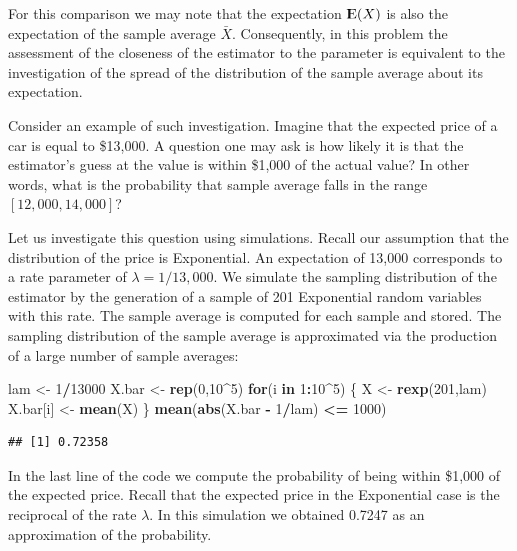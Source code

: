 \documentclass[]{krantz}
\makeatletter
\newenvironment{Shaded}{\begin{snugshade}}{\end{snugshade}}
\newcommand{\KeywordTok}[1]{\textcolor[rgb]{0.13,0.29,0.53}{\textbf{#1}}}
\newcommand{\DecValTok}[1]{\textcolor[rgb]{0.00,0.00,0.81}{#1}}
\newcommand{\StringTok}[1]{\textcolor[rgb]{0.31,0.60,0.02}{#1}}
\newcommand{\ControlFlowTok}[1]{\textcolor[rgb]{0.13,0.29,0.53}{\textbf{#1}}}
\newcommand{\OperatorTok}[1]{\textcolor[rgb]{0.81,0.36,0.00}{\textbf{#1}}}
\newcommand{\NormalTok}[1]{#1}
\newcommand{\Expec}{{\rm I\kern-.3em E}}
\newenvironment{kframe}{%
\medskip{}
\setlength{\fboxsep}{.8em}
 \def\at@end@of@kframe{}%
 \ifinner\ifhmode%
  \def\at@end@of@kframe{\end{minipage}}%
  \begin{minipage}{\columnwidth}%
 \fi\fi%
 \def\FrameCommand##1{\hskip\@totalleftmargin \hskip-\fboxsep
 \colorbox{shadecolor}{##1}\hskip-\fboxsep
     \hskip-\linewidth \hskip-\@totalleftmargin \hskip\columnwidth}%
 \MakeFramed {\advance\hsize-\width
   \@totalleftmargin\z@ \linewidth\hsize
   \@setminipage}}%
 {\par\unskip\endMakeFramed%
 \at@end@of@kframe}
\renewenvironment{Shaded}{\begin{kframe}}{\end{kframe}}
\theoremstyle{definition}
\theoremstyle{definition}
\theoremstyle{definition}
\theoremstyle{remark}
\makeatother
\begin{document}
For this comparison we may note that the expectation \(\Expec(X)\) is
also the expectation of the sample average \(\bar X\). Consequently, in
this problem the assessment of the closeness of the estimator to the
parameter is equivalent to the investigation of the spread of the
distribution of the sample average about its expectation.

Consider an example of such investigation. Imagine that the expected
price of a car is equal to \$13,000. A question one may ask is how
likely it is that the estimator's guess at the value is within \$1,000
of the actual value? In other words, what is the probability that sample
average falls in the range \([12,000, 14,000]\)?

Let us investigate this question using simulations. Recall our
assumption that the distribution of the price is Exponential. An
expectation of 13,000 corresponds to a rate parameter of
\(\lambda = 1/13,000\). We simulate the sampling distribution of the
estimator by the generation of a sample of 201 Exponential random
variables with this rate. The sample average is computed for each sample
and stored. The sampling distribution of the sample average is
approximated via the production of a large number of sample averages:

\begin{Shaded}
\begin{Highlighting}[]
\NormalTok{lam <-}\StringTok{ }\DecValTok{1}\OperatorTok{/}\DecValTok{13000}
\NormalTok{X.bar <-}\StringTok{ }\KeywordTok{rep}\NormalTok{(}\DecValTok{0}\NormalTok{,}\DecValTok{10}\OperatorTok{^}\DecValTok{5}\NormalTok{)}
\ControlFlowTok{for}\NormalTok{(i }\ControlFlowTok{in} \DecValTok{1}\OperatorTok{:}\DecValTok{10}\OperatorTok{^}\DecValTok{5}\NormalTok{) \{}
\NormalTok{  X <-}\StringTok{ }\KeywordTok{rexp}\NormalTok{(}\DecValTok{201}\NormalTok{,lam)}
\NormalTok{  X.bar[i] <-}\StringTok{ }\KeywordTok{mean}\NormalTok{(X)}
\NormalTok{\}}
\KeywordTok{mean}\NormalTok{(}\KeywordTok{abs}\NormalTok{(X.bar }\OperatorTok{-}\StringTok{ }\DecValTok{1}\OperatorTok{/}\NormalTok{lam) }\OperatorTok{<=}\StringTok{ }\DecValTok{1000}\NormalTok{)}
\end{Highlighting}
\end{Shaded}

\begin{verbatim}
## [1] 0.72358
\end{verbatim}

In the last line of the code we compute the probability of being within
\$1,000 of the expected price. Recall that the expected price in the
Exponential case is the reciprocal of the rate \(\lambda\). In this
simulation we obtained 0.7247 as an approximation of the probability.
\end{document}
